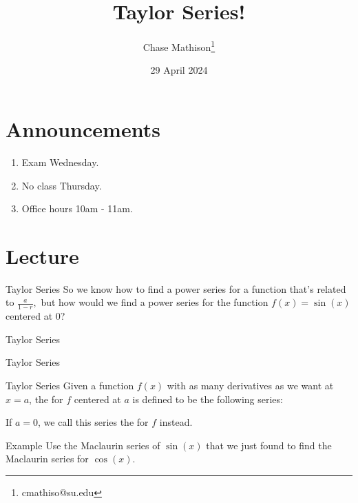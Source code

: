 \documentclass[presentation]{beamer}
\institute[SU]{Shenandoah University}
\author{Chase Mathison\thanks{cmathiso@su.edu}}
\date{29 April 2024}
\title{Taylor Series!}
\begin{document}
\maketitle

\section{Announcements}
\label{sec:org7142017}
\begin{enumerate}
\item Exam Wednesday.
\item No class Thursday.
\item Office hours 10am - 11am.
\end{enumerate}

\section{Lecture}
\label{sec:org62fe56b}
\begin{frame}[label={sec:orgac33696}]{Taylor Series}
So we know how to find a power series for a function that's related to
\(\frac{a}{1-r},\) but how would we find a power series for the
function \(f(x) = \sin(x)\) centered at \(0\)?  \vspace{10in}
\end{frame}

\begin{frame}[label={sec:orge47b20c}]{Taylor Series}
\end{frame}

\begin{frame}[label={sec:org271d911}]{Taylor Series}
\end{frame}

\begin{frame}[label={sec:org8790c72}]{Taylor Series}
Given a function \(f(x)\) with as many derivatives as we want at \(x = a\), the \uline{\hspace*{1in}} for
\(f\) centered at \(a\) is defined to be the following series:

\vspace{1in}

If \(a = 0\), we call this series the \uline{\hspace*{1in}} for \(f\) instead.
\end{frame}

\begin{frame}[label={sec:orga52c054}]{Example}
Use the Maclaurin series of \(\sin(x)\) that we just found to find the
Maclaurin series for \(\cos(x).\)
\vspace{10in}
\end{frame}
\end{document}
